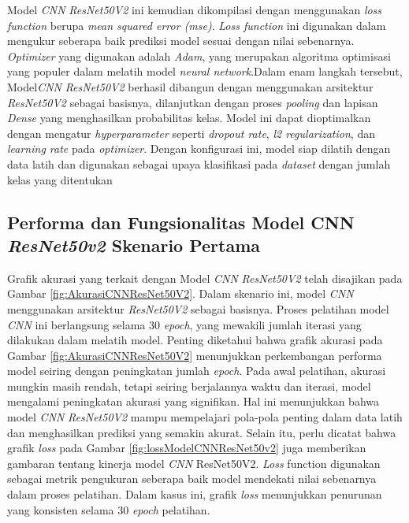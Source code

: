 Model \textit{CNN} \textit{ResNet50V2} ini kemudian dikompilasi dengan menggunakan \textit{loss function} berupa \textit{mean squared error (mse)}. \textit{Loss function} ini digunakan dalam mengukur seberapa baik prediksi model sesuai dengan nilai sebenarnya. \textit{Optimizer} yang digunakan adalah \textit{Adam}, yang merupakan algoritma optimisasi yang populer dalam melatih model \textit{neural network}.Dalam enam langkah tersebut, Model\textit{CNN} \textit{ResNet50V2} berhasil dibangun dengan menggunakan arsitektur \textit{ResNet50V2} sebagai basisnya, dilanjutkan dengan proses \textit{pooling} dan lapisan\textit{ Dense} yang menghasilkan probabilitas kelas. Model ini dapat dioptimalkan dengan mengatur \textit{hyperparameter} seperti \textit{dropout rate}, \textit{l2 regularization}, dan \textit{learning rate} pada \textit{optimizer}. Dengan konfigurasi ini, model siap  dilatih dengan data latih dan digunakan sebagai upaya klasifikasi pada \textit{dataset} dengan jumlah kelas yang ditentukan

\subsection*{Performa dan Fungsionalitas Model CNN \textit{ResNet50v2} Skenario Pertama}

Grafik akurasi yang terkait dengan Model \textit{CNN} \textit{ResNet50V2} telah disajikan pada Gambar \ref{fig:AkurasiCNNResNet50V2}. Dalam skenario ini, model \textit{CNN} menggunakan arsitektur \textit{ResNet50V2} sebagai basisnya. Proses pelatihan model \textit{CNN} ini berlangsung selama 30 \textit{epoch}, yang mewakili jumlah iterasi yang dilakukan dalam melatih model. Penting diketahui bahwa grafik akurasi pada Gambar \ref{fig:AkurasiCNNResNet50V2} menunjukkan perkembangan performa model seiring dengan peningkatan jumlah \textit{epoch}. Pada awal pelatihan, akurasi mungkin masih rendah, tetapi seiring berjalannya waktu dan iterasi, model mengalami peningkatan akurasi yang signifikan. Hal ini menunjukkan bahwa model \textit{CNN} \textit{ResNet50V2} mampu mempelajari pola-pola penting dalam data latih dan menghasilkan prediksi yang semakin akurat. Selain itu, perlu dicatat bahwa grafik \textit{loss} pada Gambar \ref{fig:lossModelCNNResNet50v2} juga memberikan gambaran tentang kinerja model \textit{CNN} ResNet50V2. \textit{Loss} function digunakan sebagai metrik pengukuran seberapa baik model mendekati nilai sebenarnya dalam proses pelatihan. Dalam kasus ini, grafik \textit{loss} menunjukkan penurunan yang konsisten selama 30 \textit{epoch} pelatihan.


